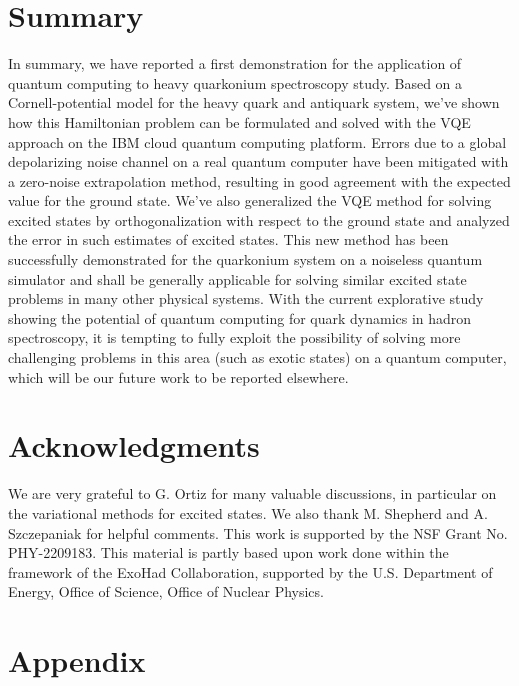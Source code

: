 \documentclass[aps,10pt,superscriptaddress,floatfix,nofootinbib,notitlepage]{revtex4-1}
\begin{document}
\section{Summary}



In summary,  we have reported a first demonstration for the application of quantum computing to heavy quarkonium spectroscopy study. Based on a Cornell-potential model for the heavy quark and antiquark system, we've shown how this Hamiltonian problem can be formulated and solved with the VQE approach on the IBM cloud quantum computing platform. Errors due to a global depolarizing noise channel on a real quantum computer have been mitigated with a zero-noise extrapolation method, resulting in good agreement with the expected value for the ground state. We've also generalized the VQE method for solving excited states by orthogonalization  with respect to the ground state and analyzed the error in such estimates of excited states. This new method has been successfully demonstrated for the quarkonium system  on a noiseless quantum simulator and shall be generally applicable for solving similar excited state problems in many other physical systems. With the current explorative study  showing the potential of quantum computing for quark dynamics in hadron spectroscopy, it is tempting to fully exploit the possibility of solving more challenging problems in this area (such as exotic states) on a quantum computer, which will be our future work to be reported elsewhere.  

 
   
\vspace{0.2in}
\section*{Acknowledgments} 
We are very grateful to G. Ortiz for many valuable discussions, in particular on the variational methods for excited states.  
We also thank M. Shepherd and A. Szczepaniak  for  helpful comments. This work is supported by  the NSF Grant No. PHY-2209183. This material is partly based upon work done within the framework of the ExoHad Collaboration, supported by the U.S. Department of Energy, Office of Science, Office of Nuclear Physics. 








\section{Appendix}
\end{document}
